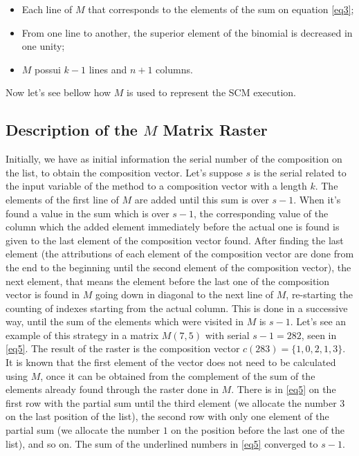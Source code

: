\documentclass{amsart}
\begin{document}
        \begin{itemize}
        \item Each line of {$M$} that corresponds to the elements of the sum on equation \ref{eq3};
        \item From one line to another, the superior element of the binomial is decreased in one unity;
        \item {$M$} possui {$k-1$} lines and {$n+1$} columns.
        \end{itemize}
        
Now let's see bellow how {$M$} is used to represent the SCM execution.

\subsection*{Description of the {$M$} Matrix Raster}

Initially, we have as initial information the serial number of the composition on the list, to obtain the composition vector. Let's suppose {$s$} is the serial related to the input variable of the method to a composition vector with a length {$k$}. The elements of the first line of {$M$} are added until this sum is over {$s-1$}. When it's found a value in the sum which is over {$s-1$}, the corresponding value of the column which the added element immediately before the actual one is found is given to the last element of the composition vector found. After finding the last element (the attributions of each element of the composition vector are done from the end to the beginning until the second element of the composition vector), the next element, that means the element before the last one of the composition vector is found in {$M$} going down in diagonal to the next line of {$M$}, re-starting the counting of indexes starting from the actual column. This is done in a successive way, until the sum of the elements which were visited in {$M$} is {$s-1$}. Let's see an example of this strategy in a matrix {$M(7,5)$} with serial {$s-1 = 282$}, seen in \ref{eq5}. The result of the raster is the composition vector {$c(283)= \{1,0,2,1,3\}$}. It is known that the first element of the vector does not need to be calculated using {$M$}, once it can be obtained from the complement of the sum of the elements already found through the raster done in {$M$}. There is in \ref{eq5} on the first row with the partial sum until the third element (we allocate the number {$3$} on the last position of the list), the second row with only one element of the partial sum (we allocate the number {$1$} on the position before the last one of the list), and so on. The sum of the underlined numbers in \ref{eq5} converged to {$s - 1$}.
\end{document}
